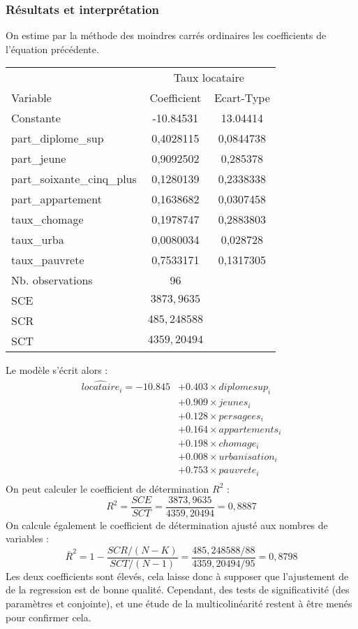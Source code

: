 \documentclass[]{article}
\begin{document}
\subsubsection{Résultats et interprétation}
On estime par la méthode des moindres carrés ordinaires les coefficients de l'équation précédente.
\begin{table}[H]
\centering
\begin{tabular}{l*{1}{cc}}
\toprule
            &\multicolumn{2}{c}{Taux locataire}\\
Variable            & Coefficient         &  Ecart-Type\\
\midrule
Constante & -10.84531 & 13.04414\\
part\_diplome\_sup	& 0,4028115	& 0,0844738\\
part\_jeune  & 0,9092502 & 0,285378\\
part\_soixante\_cinq\_plus& 0,1280139 & 0,2338338\\
part\_appartement& 0,1638682 & 0,0307458\\
taux\_chomage& 0,1978747 & 0,2883803\\
taux\_urba   & 0,0080034 & 0,028728\\
taux\_pauvrete& 0,7533171& 0,1317305\\
\midrule
Nb. observations&          96         &            \\
SCE & $3873,9635$ \\
SCR & $485,248588$ \\
SCT & $4359,20494$ \\
\bottomrule
\end{tabular}
\end{table}
Le modèle s'écrit alors : 
\begin{equation*}
    \begin{split}
			\hat{locataire}_i = -10.845 &+ 0.403 \times diplomesup_i \\
            &+ 0.909 \times jeunes_i \\
            &+ 0.128 \times persagees_i \\
            &+ 0.164 \times appartements_i \\
            &+ 0.198 \times chomage_i \\
            &+ 0.008 \times urbanisation_i \\
            &+ 0.753 \times pauvrete_i \\
    \end{split}
\end{equation*}
On peut calculer le coefficient de détermination $R^{2}$ :
\begin{equation*}
    R^{2} = \frac{SCE}{SCT} = \frac{3873,9635}{4359,20494} = 0,8887
\end{equation*}
On calcule également le coefficient de détermination ajusté aux nombres de variables :
\begin{equation*}
    \bar{R}^{2} = 1 - \frac{SCR/(N-K)}{SCT/(N-1)} = \frac{485,248588/88}{4359,20494/95} = 0,8798
\end{equation*}
Les deux coefficients sont élevés, cela laisse donc à supposer que l'ajustement de de la regression est de bonne qualité. Cependant, des tests de 
significativité (des paramètres et conjointe), et une étude de la multicolinéarité restent à être menés pour confirmer cela.
\end{document}
